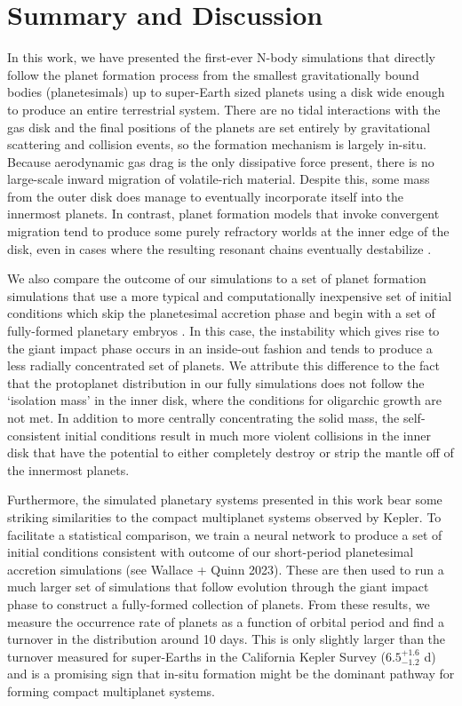 \section{Summary and Discussion} \label{sec:discuss}

In this work, we have presented the first-ever N-body simulations that directly follow the planet formation process from the smallest gravitationally bound bodies (planetesimals) up to super-Earth sized planets using a disk wide enough to produce an entire terrestrial system. There are no tidal interactions with the gas disk and the final positions of the planets are set entirely by gravitational scattering and collision events, so the formation mechanism is largely in-situ. Because aerodynamic gas drag is the only dissipative force present, there is no large-scale inward migration of volatile-rich material. Despite this, some mass from the outer disk does manage to eventually incorporate itself into the innermost planets. In contrast, planet formation models that invoke convergent migration tend to produce some purely refractory worlds at the inner edge of the disk, even in cases where the resulting resonant chains eventually destabilize \cite{raymond18}. 

We also compare the outcome of our simulations to a set of planet formation simulations that use a more typical and computationally inexpensive set of initial conditions which skip the planetesimal accretion phase and begin with a set of fully-formed planetary embryos \cite{raymond05, raymond06, hansen12}. In this case, the instability which gives rise to the giant impact phase occurs in an inside-out fashion and tends to produce a less radially concentrated set of planets. We attribute this difference to the fact that the protoplanet distribution in our fully simulations does not follow the `isolation mass' in the inner disk, where the conditions for oligarchic growth are not met. In addition to more centrally concentrating the solid mass, the self-consistent initial conditions result in much more violent collisions in the inner disk that have the potential to either completely destroy or strip the mantle off \cite{marcus09} of the innermost planets.

Furthermore, the simulated planetary systems presented in this work bear some striking similarities to the compact multiplanet systems observed by Kepler. To facilitate a statistical comparison, we train a neural network to produce a set of initial conditions consistent with outcome of our short-period planetesimal accretion simulations (see Wallace + Quinn 2023). These are then used to run a much larger set of simulations that follow evolution through the giant impact phase to construct a fully-formed collection of planets. From these results, we measure the occurrence rate of planets as a function of orbital period and find a turnover in the distribution around 10 days. This is only slightly larger than the turnover measured for super-Earths in the California Kepler Survey ($6.5^{+1.6}_{-1.2}$ d) \cite{petigura18} and is a promising sign that in-situ formation might be the dominant pathway for forming compact multiplanet systems.

